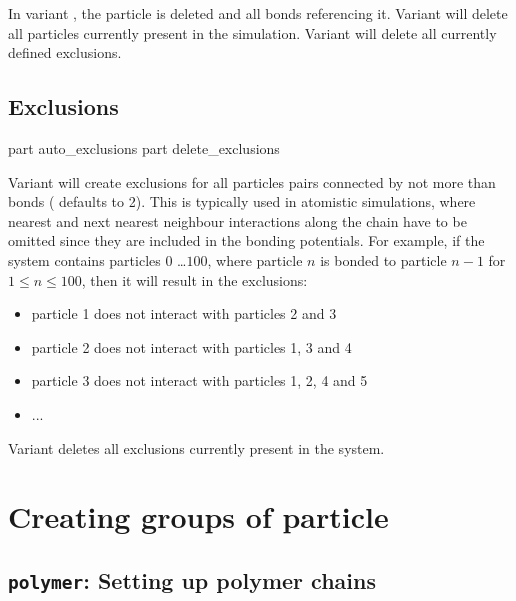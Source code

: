 In variant , the particle  is deleted
and all bonds referencing it.  Variant  will delete all
particles currently present in the simulation. Variant 
will delete all currently defined exclusions.

\subsection{Exclusions}

\begin{essyntax}
   part auto\_exclusions 
   part delete\_exclusions
  \begin{features}
  \end{features}
\end{essyntax}


Variant  will create exclusions for all particles pairs
connected by not more than  bonds ( defaults to
2). This is typically used in atomistic simulations, where nearest and
next nearest neighbour interactions along the chain have to be omitted
since they are included in the bonding potentials. For example, if the
system contains particles $0$ \dots $100$, where particle $n$ is
bonded to particle $n-1$ for $1 \leq n \leq 100$, then it will result
in the exclusions:
\begin{itemize}
  \item particle 1 does not interact with particles 2 and 3
  \item particle 2 does not interact with particles 1, 3 and 4
  \item particle 3 does not interact with particles 1, 2, 4 and 5
  \item ...
\end{itemize}

Variant  deletes all exclusions currently present in the
system.

\section{Creating groups of particle}

\subsection{\texttt{polymer}: Setting up polymer chains}

